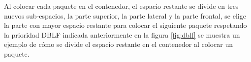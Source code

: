 Al colocar cada paquete en el contenedor, el espacio restante se divide en tres nuevos sub-espacios, la parte superior, la parte lateral y la parte frontal, se elige la parte con mayor espacio restante para colocar el siguiente paquete respetando la prioridad DBLF indicada anteriormente en la figura \ref{fig:dblf} se muestra un ejemplo de cómo se divide el espacio restante en el contenedor al colocar un paquete.